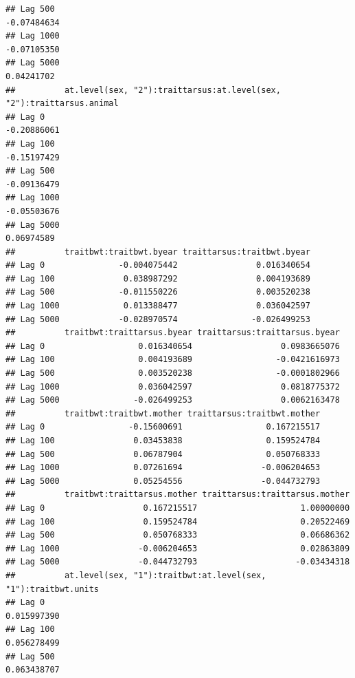 \documentclass[
  12pt,
]{book}
\begin{document}
\begin{verbatim}
## Lag 500                                                        -0.07484634
## Lag 1000                                                       -0.07105350
## Lag 5000                                                        0.04241702
##          at.level(sex, "2"):traittarsus:at.level(sex, "2"):traittarsus.animal
## Lag 0                                                             -0.20886061
## Lag 100                                                           -0.15197429
## Lag 500                                                           -0.09136479
## Lag 1000                                                          -0.05503676
## Lag 5000                                                           0.06974589
##          traitbwt:traitbwt.byear traittarsus:traitbwt.byear
## Lag 0               -0.004075442                0.016340654
## Lag 100              0.038987292                0.004193689
## Lag 500             -0.011550226                0.003520238
## Lag 1000             0.013388477                0.036042597
## Lag 5000            -0.028970574               -0.026499253
##          traitbwt:traittarsus.byear traittarsus:traittarsus.byear
## Lag 0                   0.016340654                  0.0983665076
## Lag 100                 0.004193689                 -0.0421616973
## Lag 500                 0.003520238                 -0.0001802966
## Lag 1000                0.036042597                  0.0818775372
## Lag 5000               -0.026499253                  0.0062163478
##          traitbwt:traitbwt.mother traittarsus:traitbwt.mother
## Lag 0                 -0.15600691                 0.167215517
## Lag 100                0.03453838                 0.159524784
## Lag 500                0.06787904                 0.050768333
## Lag 1000               0.07261694                -0.006204653
## Lag 5000               0.05254556                -0.044732793
##          traitbwt:traittarsus.mother traittarsus:traittarsus.mother
## Lag 0                    0.167215517                     1.00000000
## Lag 100                  0.159524784                     0.20522469
## Lag 500                  0.050768333                     0.06686362
## Lag 1000                -0.006204653                     0.02863809
## Lag 5000                -0.044732793                    -0.03434318
##          at.level(sex, "1"):traitbwt:at.level(sex, "1"):traitbwt.units
## Lag 0                                                      0.015997390
## Lag 100                                                    0.056278499
## Lag 500                                                    0.063438707

\end{verbatim}
\end{document}
